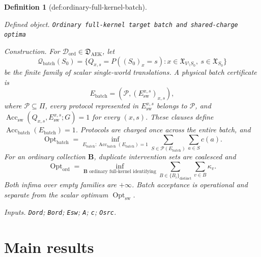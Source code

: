 \documentclass{article}
\newtheorem{definition}{Definition}
\begin{document}
\begin{definition}[def:ordinary-full-kernel-batch]\label{def:ordinary-full-kernel-batch}
\par\smallskip\noindent\emph{Defined object.} \texttt{Ordinary full-\allowbreak{}kernel target batch and shared-\allowbreak{}charge optima}
\par\smallskip\noindent\emph{Construction.} For \(\mathcal D_{\mathrm{ord}}\in\mathfrak D_{\mathrm{AEK}}\), let
\[
 \mathcal Q_{\mathrm{batch}}(S_0)
 =\{Q_{x,s}=P((S_0)_x=s):
 x\in\mathfrak X_{V\setminus S_0},\ s\in\mathfrak X_{S_0}\}
\]
be the finite family of scalar single-world translations.  A physical batch certificate is
\[
 E_{\mathrm{batch}}=(\mathcal P,(E_{\mathrm{sw}}^{x,s})_{x,s}),
\]
where \(\mathcal P\subseteq\Pi\), every protocol represented in \(E_{\mathrm{sw}}^{x,s}\) belongs to \(\mathcal P\), and
\(\operatorname{Acc}_{\mathrm{sw}}(Q_{x,s},E_{\mathrm{sw}}^{x,s};G)=1\) for every \((x,s)\).  These clauses define \(\operatorname{Acc}_{\mathrm{batch}}(E_{\mathrm{batch}})=1\).  Protocols are charged once across the entire batch, and
\[
 \operatorname{Opt}_{\mathrm{batch}}
 =\inf_{E_{\mathrm{batch}}:\operatorname{Acc}_{\mathrm{batch}}(E_{\mathrm{batch}})=1}
   \sum_{S\in\mathcal P(E_{\mathrm{batch}})}\sum_{a\in S}c(a).
\]
For an ordinary collection \(\mathbf B\), duplicate intervention sets are coalesced and
\[
 \operatorname{Opt}_{\mathrm{ord}}
 =\inf_{\mathbf B\text{ ordinary full-kernel identifying}}
   \sum_{B\in\{B_i\}_{\mathrm{distinct}}}\sum_{v\in B}\kappa_v.
\]
Both infima over empty families are \(+\infty\).  Batch acceptance is operational and separate from the scalar optimum \(\operatorname{Opt}_{\mathrm{sw}}\).
\par\smallskip\noindent\emph{Inputs.} \texttt{Dord}; \texttt{Bord}; \texttt{Esw}; \texttt{A}; \texttt{c}; \texttt{Osrc}.
\end{definition}

\section{Main results}
\end{document}
